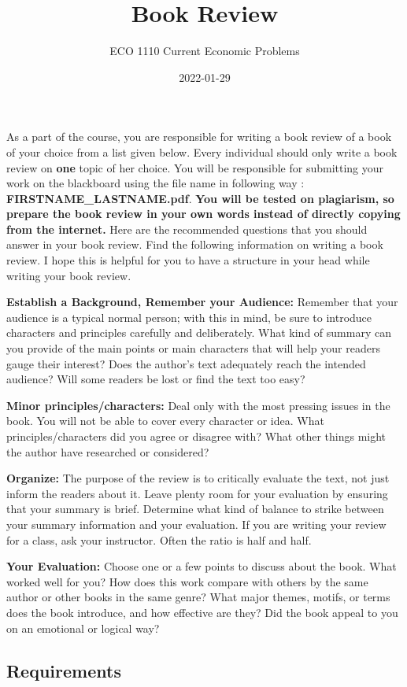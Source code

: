 \documentclass[
]{article}
\title{Book Review}
\author{ECO 1110 Current Economic Problems}
\date{2022-01-29}
\begin{document}
\maketitle

As a part of the course, you are responsible for writing a book review
of a book of your choice from a list given below. Every individual
should only write a book review on \textbf{one} topic of her choice. You
will be responsible for submitting your work on the blackboard using the
file name in following way : \textbf{FIRSTNAME\_LASTNAME.pdf}.
\textbf{You will be tested on plagiarism, so prepare the book review in
your own words instead of directly copying from the internet.} Here are
the recommended questions that you should answer in your book review.
Find the following information on writing a book review. I hope this is
helpful for you to have a structure in your head while writing your book
review.

\textbf{Establish a Background, Remember your Audience:} Remember that
your audience is a typical normal person; with this in mind, be sure to
introduce characters and principles carefully and deliberately. What
kind of summary can you provide of the main points or main characters
that will help your readers gauge their interest? Does the author's text
adequately reach the intended audience? Will some readers be lost or
find the text too easy?

\textbf{Minor principles/characters:} Deal only with the most pressing
issues in the book. You will not be able to cover every character or
idea. What principles/characters did you agree or disagree with? What
other things might the author have researched or considered?

\textbf{Organize:} The purpose of the review is to critically evaluate
the text, not just inform the readers about it. Leave plenty room for
your evaluation by ensuring that your summary is brief. Determine what
kind of balance to strike between your summary information and your
evaluation. If you are writing your review for a class, ask your
instructor. Often the ratio is half and half.

\textbf{Your Evaluation:} Choose one or a few points to discuss about
the book. What worked well for you? How does this work compare with
others by the same author or other books in the same genre? What major
themes, motifs, or terms does the book introduce, and how effective are
they? Did the book appeal to you on an emotional or logical way?

\hypertarget{requirements}{%
\subsection{Requirements}\label{requirements}}
\end{document}

